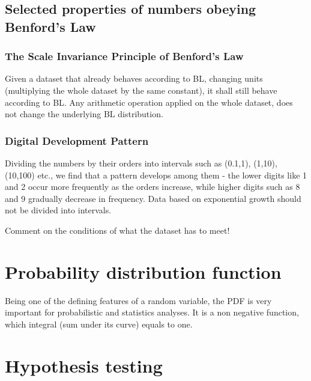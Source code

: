 \subsection{Selected properties of numbers obeying Benford's Law}

\subsubsection{The Scale Invariance Principle of Benford's Law}

Given a dataset that already behaves according to BL, changing units (multiplying the whole dataset by the same constant), it shall still behave according to BL. Any arithmetic operation applied on the whole dataset, does not change the underlying BL distribution. \cite{kossovsky2014benford, Hronova2023} %

\subsubsection{Digital Development Pattern}

Dividing the numbers by their orders into intervals such as (0.1,1), (1,10), (10,100) etc., we find that a pattern develops among them - the lower digits like 1 and 2 occur more frequently as the orders increase, while higher digits such as 8 and 9 gradually decrease in frequency. Data based on exponential growth should not be divided into intervals. \cite{kossovsky2014benford} %


\begin{koment}
Comment on the conditions of what the dataset has to meet! 
\end{koment}

\section{Probability distribution function}

Being one of the defining features of a random variable, the PDF is very important for probabilistic and statistics analyses. It is a non negative function, which integral (sum under its curve) equals to one. 


\section{Hypothesis testing}

